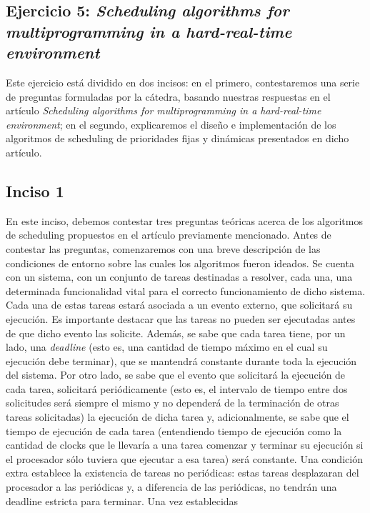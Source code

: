 \subsection{Ejercicio 5: \textit{Scheduling algorithms for multiprogramming in a hard-real-time environment}}
Este ejercicio est\'a dividido en dos incisos: en el primero, contestaremos una serie de preguntas formuladas por la c\'atedra, basando nuestras respuestas en el 
art\'iculo \textit{Scheduling algorithms for multiprogramming in a hard-real-time environment}; en el segundo, explicaremos el dise\~no e implementaci\'on 
de los algoritmos de scheduling de prioridades fijas y din\'amicas presentados en dicho art\'iculo.
\subsection*{Inciso 1}
En este inciso, debemos contestar tres preguntas te\'oricas acerca de los algoritmos de scheduling propuestos en el art\'iculo previamente mencionado. Antes de 
contestar las preguntas, comenzaremos con una breve descripci\'on de las condiciones de entorno sobre las cuales los algoritmos fueron ideados.
\newline
\newline
Se cuenta con un sistema, con un conjunto de tareas destinadas a resolver, cada una, una determinada funcionalidad vital para el correcto funcionamiento
de dicho sistema. Cada una de estas tareas estar\'a asociada a un evento externo, que solicitar\'a su ejecuci\'on. Es importante destacar que las tareas no
pueden ser ejecutadas antes de que dicho evento las solicite. Adem\'as, se sabe que cada tarea tiene, por un lado, una \textit{deadline} (esto es, una cantidad
de tiempo m\'aximo en el cual su ejecuci\'on debe terminar), que se mantendr\'a constante durante toda la ejecuci\'on del sistema. Por otro lado, se sabe
que el evento que solicitar\'a la ejecuci\'on de cada tarea, solicitar\'a peri\'odicamente (esto es, el intervalo de tiempo entre dos solicitudes ser\'a
siempre el mismo y no depender\'a de la terminaci\'on de otras tareas solicitadas) la ejecuci\'on de dicha tarea y, adicionalmente, se sabe que el tiempo de 
ejecuci\'on de cada tarea (entendiendo tiempo de ejecuci\'on como la cantidad de clocks que le llevar\'ia a una tarea comenzar y terminar su ejecuci\'on si el 
procesador s\'olo tuviera que ejecutar a esa tarea) ser\'a constante. Una condici\'on extra establece la existencia de tareas no peri\'odicas: estas tareas
desplazaran del procesador a las peri\'odicas y, a diferencia de las peri\'odicas, no tendr\'an una deadline estricta para terminar. Una vez establecidas
